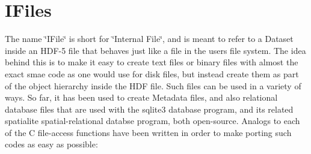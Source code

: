\hypertarget{ifile_library_object_ifiles}{}\section{I\+Files}\label{ifile_library_object_ifiles}

The name \char`\"{}\+I\+File\char`\"{} is short for \char`\"{}\+Internal File\char`\"{}, and is meant to refer to a Dataset inside an H\+D\+F-\/5 file that behaves just like a file in the user\textquotesingle{}s file system. The idea behind this is to make it easy to create text files or binary files with almost the exact smae code as one would use for disk files, but instead create them as part of the object hierarchy inside the H\+D\+F file. Such files can be used in a variety of ways. So far, it has been used to create Metadata files, and also relational database files that are used with the {\ttfamily sqlite3} database program, and its related {\ttfamily spatialite} spatial-\/relational databse program, both open-\/source. Analogs to each of the C file-\/access functions have been written in order to make porting such codes as easy as possible\+: \begin{DoxyItemize}

\end{DoxyItemize}
